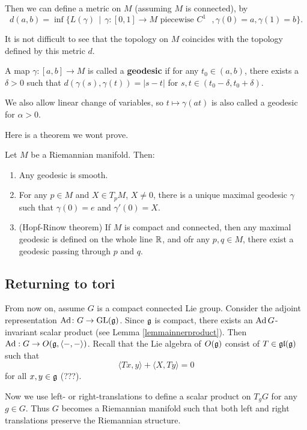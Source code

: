 \documentclass[11pt, english]{article}
\begin{document}
Then we can define a metric on $M$ (assuming $M$ is connected), by
$$
d(a,b) = \inf \{ L(\gamma) \, \mid \, \gamma:[0,1] \to M \text{ piecewise $C^1$ }, \gamma(0)=a, \gamma(1)=b \}.
$$

It is not difficult to see that the topology on $M$ coincides with the topology defined by this metric $d$.

A map $\gamma:[a,b] \to M$ is called a \textbf{geodesic} if for any $t_0 \in (a,b)$, there exists a $\delta > 0$ such that $d( \gamma(s), \gamma(t) ) = \lvert s - t \rvert$ for $s,t \in (t_0-\delta, t_0+\delta)$. 

We also allow linear change of variables, so $t \mapsto \gamma(a t)$ is also called a geodesic for $\alpha > 0$. 

Here is a theorem we wont prove.

\begin{thm}
\label{theoremgeodesic}
  Let $M$ be a Riemannian manifold. Then:
  \begin{enumerate}
  \item Any geodesic is smooth.
\item For any $p \in M$ and $X \in T_pM$, $X \neq 0$, there is a unique maximal geodesic $\gamma$ such that $\gamma(0)=e$ and $\gamma'(0)=X$.
\item (Hopf-Rinow theorem) If $M$ is compact and connected, then any maximal geodesic is defined on the whole line $\mathbb{R}$, and ofr any $p,q \in M$, there exist a geodesic passing through $p$ and $q$. 
  \end{enumerate}
\end{thm}

\subsection{Returning to tori}

From now on, assume $G$ is a compact connected Lie group. Consider the adjoint representation $\operatorname{Ad} \colon  G \to \operatorname{GL}(\mathfrak g)$. Since $\mathfrak g$ is compact, there exists an $\operatorname{Ad} G$-invariant scalar product (see Lemma \ref{lemmainnerproduct}). Then $\operatorname{Ad}:G \to O(\mathfrak g, \langle-,- \rangle)$. Recall that the Lie algebra of $O(\mathfrak g)$ consist of $T \in \mathfrak{gl}(\mathfrak g)$ such that
$$
\langle Tx,y  \rangle  + \langle X,Ty \rangle = 0
$$
for all $x,y \in \mathfrak g$ (???). 

Now we use left- or right-translations to define a scalar product on $T_gG$ for any $g \in G$. Thus $G$ becomes a Riemannian manifold such that both left and right translations preserve the Riemannian structure.
\end{document}
